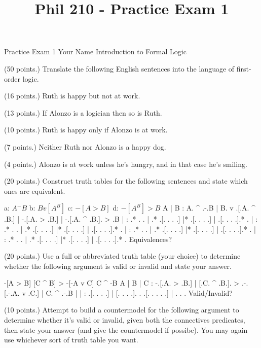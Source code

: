 
\title{Phil 210 - Practice Exam 1}

\heading
Practice Exam 1
Your Name
Introduction to Formal Logic
\endheading

(50 points.) Translate the following English sentences into the language of first-order logic.

\problems
{} (16 points.)
Ruth is happy but not at work.
	\answer
	$ $
	\endanswer

 (13 points.)
If Alonzo is a logician then so is Ruth.
	\answer
	$ $
	\endanswer

 (10 points.)
Ruth is happy only if Alonzo is at work.
	\answer
	$ $
	\endanswer

 (7 points.)
Neither Ruth nor Alonzo is a happy dog.
	\answer
	$ $
	\endanswer

 (4 points.)
Alonzo is at work unless he's hungry, and in that case he's smiling.
	\answer
	$ $
	\endanswer

\endproblems

(20 points.) Construct truth tables for the following sentences and state which ones are equivalent.

\problems
{}
\list
a: $ A ^ -B $
b: $ B v [A ^ B] $
c: $ -[A > B] $
d: $ -[A ^ B] > B $
\endlist
	\answer
	\truthtable
	 A | B : A. ^ .-.B | B. v .[.A. ^ .B.] | -.[.A. > .B.] | -.[.A. ^ .B.]. > .B
	\truthtableline
	   |   :  .*  . .  |  .*  .[. .   . .] |* .[. .   . .] |  .[. .   . .].*  . 
	   |   :  .*  . .  |  .*  .[. .   . .] |* .[. .   . .] |  .[. .   . .].*  . 
	   |   :  .*  . .  |  .*  .[. .   . .] |* .[. .   . .] |  .[. .   . .].*  . 
	   |   :  .*  . .  |  .*  .[. .   . .] |* .[. .   . .] |  .[. .   . .].*  . 
	\endtruthtable
	Equivalences?
	\endanswer

\endproblems

(20 points.) Use a full or abbreviated truth table (your choice) to determine whether the following argument is valid or invalid and state your answer.

\problems
{}
\argument
 -[A > B]
 [C ^ B] > -[-A v C]
\argumentline
 C ^ -B
\endargument
	\answer
	\truthtable
	 A | B | C : -.[.A. > .B.] | [.C. ^ .B.]. > .-.[.-.A. v .C.] | C. ^ .-.B
	\truthtableline
	   |   |   :  .[. .   . .] | [. .   . .].   . .[. . .   . .] |  .   . . 
	\endtruthtable
	Valid/Invalid?
	\endanswer

\endproblems

(10 points.) Attempt to build a countermodel for the following argument to determine whether it's valid or invalid, given both the connectives predicates, then state your answer (and give the countermodel if possibe). You may again use whichever sort of truth table you want.


